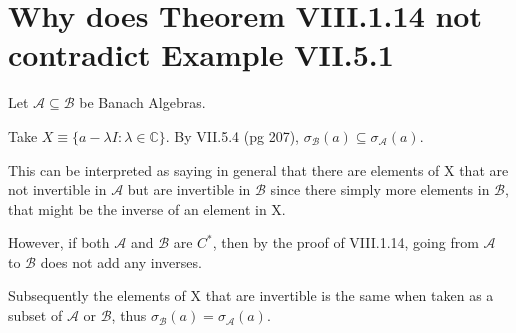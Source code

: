\documentclass{article}
\begin{document}
\section{Why does Theorem VIII.1.14 not contradict Example VII.5.1}

Let $\mathscr{A} \subseteq \mathscr{B}$ be Banach Algebras.

Take $X \equiv \{a-\lambda I : \lambda \in \mathbb{C} \}$. By VII.5.4 (pg 207), $\sigma_{\mathscr{B}}(a) \subseteq \sigma_{\mathscr{A}}(a)$.

This can be interpreted as saying in general that there are elements of X that are not invertible in $\mathscr{A}$ but are invertible in $\mathscr{B}$ since there simply more elements in $\mathscr{B}$, that might be the inverse of an element in X.

However, if both $\mathscr{A}$ and $\mathscr{B}$ are $C^*$, then by the proof of VIII.1.14, going from $\mathscr{A}$ to $\mathscr{B}$ does not add any inverses.

Subsequently the elements of X that are invertible is the same when taken as a subset of $\mathscr{A}$ or $\mathscr{B}$, thus $\sigma_{\mathscr{B}}(a) = \sigma_{\mathscr{A}}(a)$.
\end{document}
